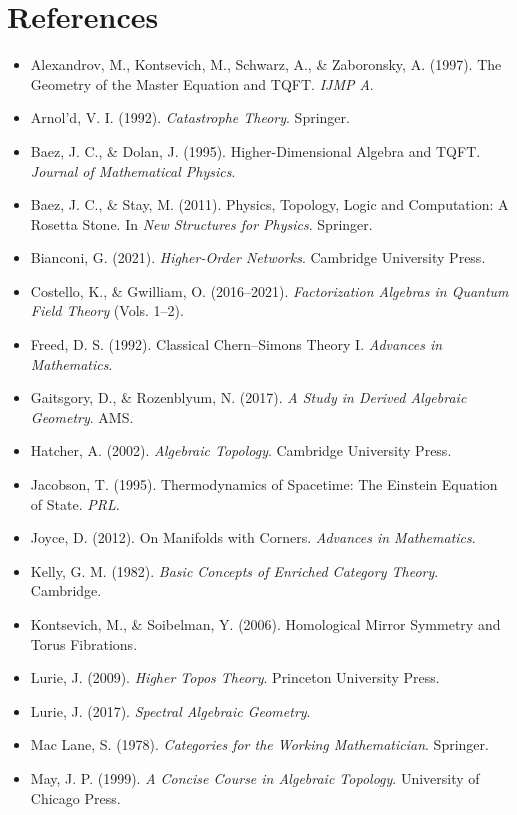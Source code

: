 \documentclass[12pt]{article}
\begin{document}
\section{References}
\begin{itemize}[leftmargin=1.2em]
  \item Alexandrov, M., Kontsevich, M., Schwarz, A., \& Zaboronsky, A. (1997). The Geometry of the Master Equation and TQFT. \emph{IJMP A}.
  \item Arnol'd, V. I. (1992). \emph{Catastrophe Theory}. Springer.
  \item Baez, J. C., \& Dolan, J. (1995). Higher-Dimensional Algebra and TQFT. \emph{Journal of Mathematical Physics}.
  \item Baez, J. C., \& Stay, M. (2011). Physics, Topology, Logic and Computation: A Rosetta Stone. In \emph{New Structures for Physics}. Springer.
  \item Bianconi, G. (2021). \emph{Higher-Order Networks}. Cambridge University Press.
  \item Costello, K., \& Gwilliam, O. (2016--2021). \emph{Factorization Algebras in Quantum Field Theory} (Vols. 1--2).
  \item Freed, D. S. (1992). Classical Chern--Simons Theory I. \emph{Advances in Mathematics}.
  \item Gaitsgory, D., \& Rozenblyum, N. (2017). \emph{A Study in Derived Algebraic Geometry}. AMS.
  \item Hatcher, A. (2002). \emph{Algebraic Topology}. Cambridge University Press.
  \item Jacobson, T. (1995). Thermodynamics of Spacetime: The Einstein Equation of State. \emph{PRL}.
  \item Joyce, D. (2012). On Manifolds with Corners. \emph{Advances in Mathematics}.
  \item Kelly, G. M. (1982). \emph{Basic Concepts of Enriched Category Theory}. Cambridge.
  \item Kontsevich, M., \& Soibelman, Y. (2006). Homological Mirror Symmetry and Torus Fibrations.
  \item Lurie, J. (2009). \emph{Higher Topos Theory}. Princeton University Press.
  \item Lurie, J. (2017). \emph{Spectral Algebraic Geometry}.
  \item Mac Lane, S. (1978). \emph{Categories for the Working Mathematician}. Springer.
  \item May, J. P. (1999). \emph{A Concise Course in Algebraic Topology}. University of Chicago Press.

\end{itemize}
\end{document}
